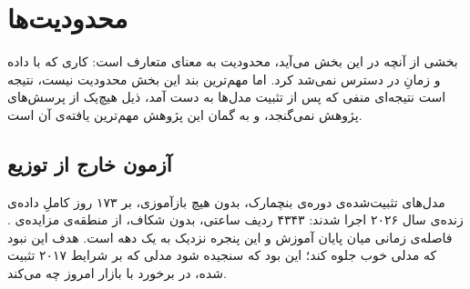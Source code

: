 
\section{محدودیت‌ها}
\label{sec:5-2}

بخشی از آنچه در این بخش می‌آید، محدودیت به معنای متعارف است: کاری که با داده و
زمانِ در دسترس نمی‌شد کرد. اما مهم‌ترین بند این بخش محدودیت نیست، نتیجه است 
نتیجه‌ای منفی که پس از تثبیت مدل‌ها به دست آمد، ذیل هیچ‌یک از پرسش‌های پژوهش
نمی‌گنجد، و به گمان این پژوهش مهم‌ترین یافته‌ی آن است.

\subsection*{آزمون خارج از توزیع}

مدل‌های تثبیت‌شده‌ی دوره‌ی بنچمارک، بدون هیچ بازآموزی، بر ۱۷۳ روز کاملِ داده‌ی
زنده‌ی سال ۲۰۲۶ اجرا شدند: ۴۳۴۳ ردیف ساعتی، بدون شکاف، از منطقه‌ی مزایده‌ی
. فاصله‌ی زمانی میان پایان آموزش و این پنجره نزدیک به یک دهه است. هدف
این نبود که مدلی خوب جلوه کند؛ این بود که سنجیده شود مدلی که بر شرایط ۲۰۱۷
تثبیت شده، در برخورد با بازار امروز چه می‌کند.

